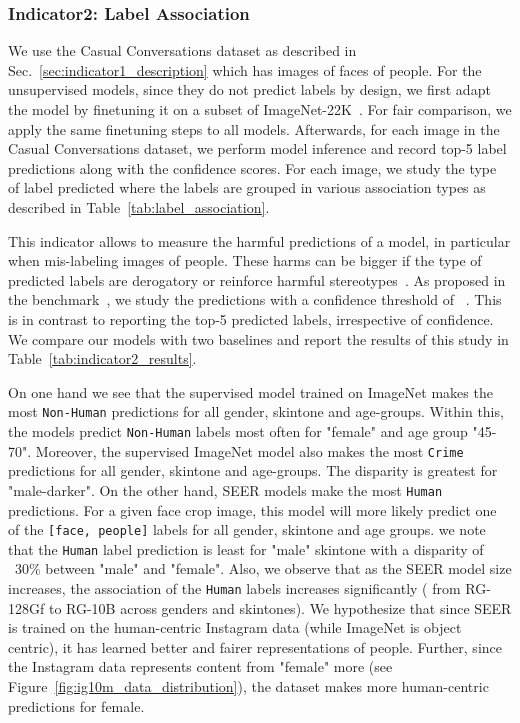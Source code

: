 \documentclass[10pt,twocolumn,letterpaper]{article}
\newcommand{\ImNetFull}{ImageNet-22K\xspace}
\newcommand{\casualconv}{Casual Conversations\xspace}
\newcommand{\seer}{SEER\xspace}
\begin{document}
\subsubsection{Indicator2: Label Association}
\label{sec:label_association}

We use the \casualconv dataset as described in Sec.~\ref{sec:indicator1_description} which has  images of faces of people.
For the unsupervised models, since they do not predict labels by design, we first adapt the model by finetuning it on a subset of \ImNetFull~\cite{goyal2022fairness}. 
For fair comparison, we apply the same finetuning steps to all models. 
Afterwards, for each image in the \casualconv dataset, we perform model inference and record top-5 label predictions along with the confidence scores. 
For each image, we study the type of label predicted where the labels are grouped in various association types as described in Table~\ref{tab:label_association}.

This indicator allows to measure the harmful predictions of a model, in particular when mis-labeling images of people. 
These harms can be bigger if the type of predicted labels are derogatory or reinforce harmful stereotypes~\cite{doi:10.1177/2378023120967171,bhargava2019exposing}. 
As proposed in the benchmark~\cite{goyal2022fairness}, we study the predictions with a confidence threshold of ~\cite{stock2018convnets}. 
This is in contrast to reporting the top-5 predicted labels, irrespective of confidence. 
We compare our models with two baselines and report the results of this study in Table~\ref{tab:indicator2_results}.

On one hand we see that the supervised model trained on ImageNet makes the most \texttt{Non-Human} predictions for all gender, skintone and age-groups. 
Within this, the models predict \texttt{Non-Human} labels most often for "female" and age group "45-70".
Moreover, the supervised ImageNet model also makes the most \texttt{Crime} predictions for all gender, skintone and age-groups. 
The disparity is greatest for "male-darker".
On the other hand, \seer models make the most \texttt{Human} predictions.
For a given face crop image, this model will more likely predict one of the \texttt{[face, people]} labels for all gender, skintone and age groups.
we note that the \texttt{Human} label prediction is least for "male" skintone with a disparity of ~30\% between "male" and "female".
Also, we observe that as the SEER model size increases, the association of the \texttt{Human} labels increases significantly ( from RG-128Gf to RG-10B across genders and skintones).
We hypothesize that since SEER is trained on the human-centric Instagram data (while ImageNet is object centric), it has learned better and fairer representations of people. 
Further, since the Instagram data represents content from "female" more (see Figure~\ref{fig:ig10m_data_distribution}), the dataset makes more human-centric predictions for female.
\end{document}
